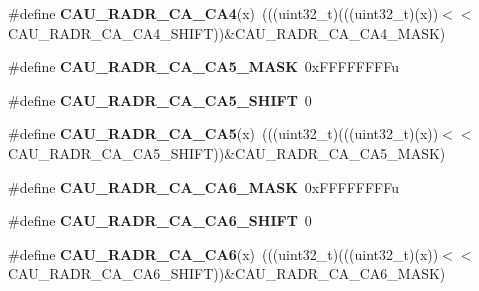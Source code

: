 \begin{DoxyCompactItemize}
\item 
\#define {\bfseries C\+A\+U\+\_\+\+R\+A\+D\+R\+\_\+\+C\+A\+\_\+\+C\+A4}(x)~(((uint32\+\_\+t)(((uint32\+\_\+t)(x))$<$$<$C\+A\+U\+\_\+\+R\+A\+D\+R\+\_\+\+C\+A\+\_\+\+C\+A4\+\_\+\+S\+H\+I\+FT))\&C\+A\+U\+\_\+\+R\+A\+D\+R\+\_\+\+C\+A\+\_\+\+C\+A4\+\_\+\+M\+A\+SK)\hypertarget{group__CAU__Register__Masks_ga20080f8c8199450d8260df2db339e74c}{}\label{group__CAU__Register__Masks_ga20080f8c8199450d8260df2db339e74c}

\item 
\#define {\bfseries C\+A\+U\+\_\+\+R\+A\+D\+R\+\_\+\+C\+A\+\_\+\+C\+A5\+\_\+\+M\+A\+SK}~0x\+F\+F\+F\+F\+F\+F\+F\+Fu\hypertarget{group__CAU__Register__Masks_ga042e25609d552ff6fab834eb7ef16ace}{}\label{group__CAU__Register__Masks_ga042e25609d552ff6fab834eb7ef16ace}

\item 
\#define {\bfseries C\+A\+U\+\_\+\+R\+A\+D\+R\+\_\+\+C\+A\+\_\+\+C\+A5\+\_\+\+S\+H\+I\+FT}~0\hypertarget{group__CAU__Register__Masks_gad8bf0b422addabdffbfde146a1d601b3}{}\label{group__CAU__Register__Masks_gad8bf0b422addabdffbfde146a1d601b3}

\item 
\#define {\bfseries C\+A\+U\+\_\+\+R\+A\+D\+R\+\_\+\+C\+A\+\_\+\+C\+A5}(x)~(((uint32\+\_\+t)(((uint32\+\_\+t)(x))$<$$<$C\+A\+U\+\_\+\+R\+A\+D\+R\+\_\+\+C\+A\+\_\+\+C\+A5\+\_\+\+S\+H\+I\+FT))\&C\+A\+U\+\_\+\+R\+A\+D\+R\+\_\+\+C\+A\+\_\+\+C\+A5\+\_\+\+M\+A\+SK)\hypertarget{group__CAU__Register__Masks_ga42ae443cab04330b104ce22a986df9d7}{}\label{group__CAU__Register__Masks_ga42ae443cab04330b104ce22a986df9d7}

\item 
\#define {\bfseries C\+A\+U\+\_\+\+R\+A\+D\+R\+\_\+\+C\+A\+\_\+\+C\+A6\+\_\+\+M\+A\+SK}~0x\+F\+F\+F\+F\+F\+F\+F\+Fu\hypertarget{group__CAU__Register__Masks_gac15bff5a590f321f7edcc30599c9e060}{}\label{group__CAU__Register__Masks_gac15bff5a590f321f7edcc30599c9e060}

\item 
\#define {\bfseries C\+A\+U\+\_\+\+R\+A\+D\+R\+\_\+\+C\+A\+\_\+\+C\+A6\+\_\+\+S\+H\+I\+FT}~0\hypertarget{group__CAU__Register__Masks_ga93c9d65769c30135083c7aeb0300184f}{}\label{group__CAU__Register__Masks_ga93c9d65769c30135083c7aeb0300184f}

\item 
\#define {\bfseries C\+A\+U\+\_\+\+R\+A\+D\+R\+\_\+\+C\+A\+\_\+\+C\+A6}(x)~(((uint32\+\_\+t)(((uint32\+\_\+t)(x))$<$$<$C\+A\+U\+\_\+\+R\+A\+D\+R\+\_\+\+C\+A\+\_\+\+C\+A6\+\_\+\+S\+H\+I\+FT))\&C\+A\+U\+\_\+\+R\+A\+D\+R\+\_\+\+C\+A\+\_\+\+C\+A6\+\_\+\+M\+A\+SK)\hypertarget{group__CAU__Register__Masks_gab6e6fbb33f9e4f51d142433e3008bafb}{}\label{group__CAU__Register__Masks_gab6e6fbb33f9e4f51d142433e3008bafb}


\end{DoxyCompactItemize}
